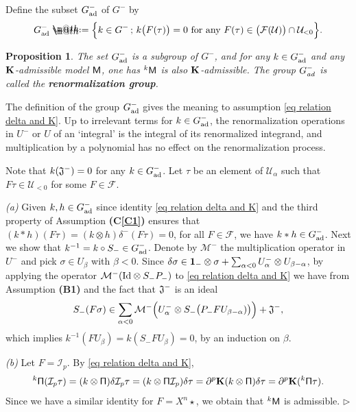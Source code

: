 \documentclass[10pt, reqno]{amsart}
\makeatletter
\numberwithin{subsection}{section}
\numberwithin{subsubsection}{subsection}
\numberwithin{equation}{section} %
\newenvironment{Dem}[1][\unskip]{%
    \begin{list}{\hspace{1.15cm}{\sf \textbf{{\small Proof #1 --}}}}{%
        \setlength{\topsep}{0pt}%
        \setlength{\leftmargin}{0pt}%
        \setlength{\rightmargin}{0pt}%
        \setlength{\listparindent}{0pt}%
        \setlength{\itemindent}{0pt}%
        \setlength{\parsep}{0pt}%
        \addtolength{\leftmargin}{0pt}%
        \addtolength{\rightmargin}{0pt}%
    } \item }{\hfill $\rhd$\end{list}\smallskip}
\theoremstyle{mystyle}
\newtheorem{prop}[thm]{\hspace{-0.13cm} {Proposition}}%
\theoremstyle{mystyle2}
\theoremstyle{mystyle3}
\newcommand{\refC}[1]{\textbf{\textsf{(C\ref{#1})}}}
\newcommand{\mcF}{\boldsymbol{p}}
\newcommand{\ssk}{\smallskip}
\renewcommand{\mcF}{\mathcal{F}}
\newcommand{\mcI}{\mathcal{I}}
\newcommand{\mcM}{\mathcal{M}}
\newcommand\mcU{\mathcal U}
\newcommand*{\defeq}{\mathrel{\rlap{%
                     \raisebox{0.3ex}{$\m@th\cdot$}}%
                     \raisebox{-0.3ex}{$\m@th\cdot$}}%
                     =}
\makeatother
\begin{document}
\medskip

Define the subset $G_{\text{\rm ad}}^-$ of $G^-$ by
$$
G_{\text{\rm ad}}^- \defeq  \Big\{k\in G^-\, ;\, k\big(F(\tau)\big)=0\ \text{for any}\ F(\tau)\in\big(\mcF(\mcU)\big)\cap\mcU_{<0}\Big\}.
$$
\medskip

\begin{prop}
The set $G_{\text{\rm ad}}^-$ is a subgroup of $G^-$, and for any $k\in G_{\text{\rm ad}}^-$ and any $\bf K$-admissible model $\sf M$, one has ${}^k{\sf M}$ is also $\bf K$-admissible. The group $G^-_\textrm{\emph{ad}}$ 
is called the \textbf{\textsf{renormalization group}}.
\end{prop}

\medskip

The definition of the group $G_{\text{\rm ad}}^-$ gives the meaning to assumption \eqref{eq relation delta and K}. Up to irrelevant terms for $k\in G_{\text{\rm ad}}^-$, the renormalization operations in $U^-$ or $U$ of 
an `integral' is the integral of its renormalized integrand, and multiplication by a polynomial has no effect on the renormalization process.   

\medskip

\begin{Dem}
Note that $k(\frak{J}^-)=0$ for any $k\in G_{\text{\rm ad}}^-$. Let $\tau$ be an element of $\mcU_\alpha$ such that $F\tau\in\mcU_{<0}$ for some $F\in\mcF$.

\ssk

\textit{\textsf{(a)}}
Given $k,h\in G_{\text{\rm ad}}^-$ since identity \eqref{eq relation delta and K} and the third property of Assumption \refC{C1} ensures that $(k*h)(F\tau)=(k\otimes h)\delta^-(F\tau)=0$, for all $F\in\mcF$, we have $k*h\in G_{\text{\rm ad}}^-$. Next we show that $k^{-1}=k\circ S_-\in G_{\text{\rm ad}}^-$. Denote by $\mcM^-$ the multiplication operator in $U^-$ and pick $\sigma\in U_\beta$ with $\beta<0$. Since $\delta\sigma\in {\bf1}_-\otimes\sigma+ \sum_{\alpha<0}U_{\alpha}^-\otimes U_{\beta-\alpha}$, by applying the operator $\mcM^-(\text{\rm Id}\otimes S_-P_-)$ to \eqref{eq relation delta and K} we have from Assumption \textsf{\textbf{(B1)}} and the fact that $\frak{J}^-$ is an ideal
$$
S_-(F\sigma)\in \sum_{\alpha<0}\mcM^-\Big(U_{\alpha}^-\otimes S_-\big(P_-FU_{\beta-\alpha})\big)\Big)+\frak{J}^-,
$$
which implies $k^{-1}(FU_\beta)=k(S_-FU_\beta)=0$, by an induction on $\beta$.

\ssk

\textit{\textsf{(b)}}
Let $F=\mcI_p$. By \eqref{eq relation delta and K},
$$
{}^k{\sf \Pi}(\mcI_p\tau)
=(k\otimes{\sf \Pi})\delta \mcI_p\tau
=(k\otimes{\sf \Pi}\mcI_p)\delta\tau
=\partial^p{\bf K}(k\otimes{\sf \Pi})\delta\tau
=\partial^p{\bf K}({}^k{\sf \Pi}\tau).
$$
Since we have a similar identity for $F=X^n\star$, we obtain that ${}^k{\sf M}$ is admissible.
\end{Dem}   
\end{document}

